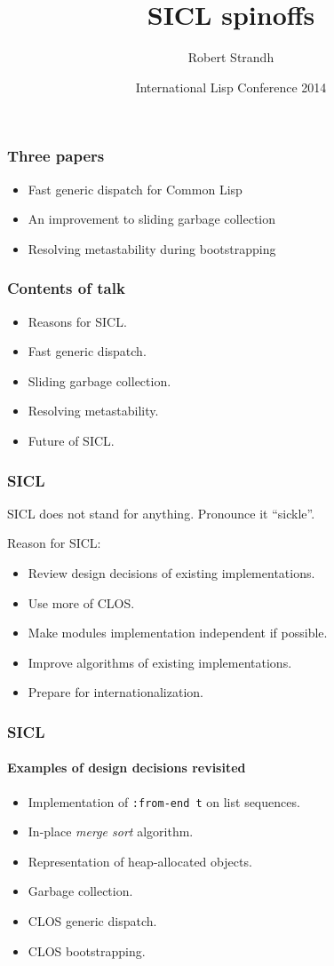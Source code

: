 \documentclass{beamer}
\title{SICL spinoffs}
\author{Robert Strandh\inst{1}}
\institute{\inst{1}Université de Bordeaux}
\date[ILC 2014]{International Lisp Conference 2014}
\begin{document}
\begin{frame}
  \titlepage
\end{frame}
\begin{frame}
\frametitle{Three papers}

\begin{itemize}
\item Fast generic dispatch for Common Lisp
\item An improvement to sliding garbage collection
\item Resolving metastability during bootstrapping
\end{itemize}

\end{frame}
\begin{frame}
\frametitle{Contents of talk}

\begin{itemize}
\item Reasons for SICL.
\item Fast generic dispatch.
\item Sliding garbage collection.
\item Resolving metastability.
\item Future of SICL.
\end{itemize}
\end{frame}
\begin{frame}
\frametitle{SICL}

SICL does not stand for anything.  Pronounce it ``sickle''.

Reason for SICL:

\begin{itemize}
\item Review design decisions of existing implementations.
\item Use more of CLOS.
\item Make modules implementation independent if possible.
\item Improve algorithms of existing implementations. 
\item Prepare for internationalization. 
\end{itemize}
\end{frame}
\begin{frame}
\frametitle{SICL}
\framesubtitle{Examples of design decisions revisited}

\begin{itemize}
\item Implementation of \texttt{:from-end t} on list sequences.
\item In-place \emph{merge sort} algorithm. 
\item Representation of heap-allocated objects.
\item Garbage collection.
\item CLOS generic dispatch.
\item CLOS bootstrapping.
\end{itemize}
\end{frame}
\end{document}
